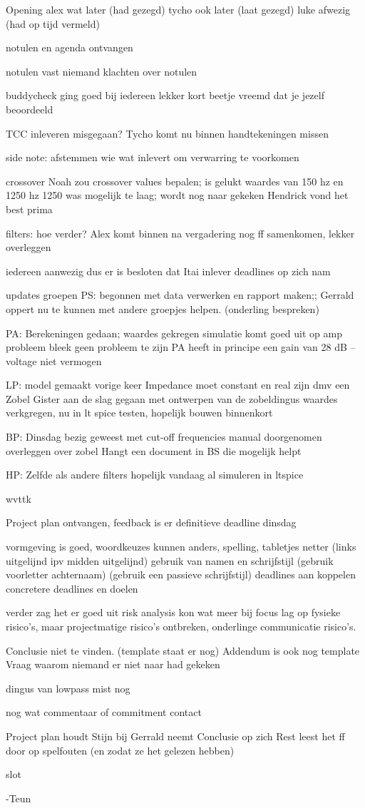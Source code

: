 Opening
alex wat later (had gezegd)
tycho ook later (laat gezegd)
luke afwezig (had op tijd vermeld)

notulen en agenda ontvangen

notulen vast
niemand klachten over notulen

buddycheck
ging goed bij iedereen
lekker kort
beetje vreemd dat je jezelf beoordeeld 

TCC
inleveren misgegaan?
Tycho komt nu binnen
handtekeningen missen 

side note: afstemmen wie wat inlevert om verwarring te voorkomen 

crossover
Noah zou crossover values bepalen; is gelukt 
waardes van 150 hz en 1250 hz
1250 was mogelijk te laag; wordt nog naar gekeken
Hendrick vond het best prima

filters: hoe verder?
Alex komt binnen
na vergadering nog ff samenkomen, lekker overleggen

iedereen aanwezig dus er is besloten dat Itai inlever deadlines op zich nam

updates groepen
PS: begonnen met data verwerken en rapport maken;; Gerrald oppert nu te kunnen met andere groepjes helpen. (onderling bespreken)

PA: Berekeningen gedaan; waardes gekregen
simulatie komt goed uit
op amp probleem bleek geen probleem te zijn
PA heeft in principe een gain van 28 dB  – voltage niet vermogen

LP: model gemaakt vorige keer
Impedance moet constant en real zijn dmv een Zobel
Gister aan de slag gegaan met ontwerpen van de zobeldingus
waardes verkgregen, nu in lt spice testen, hopelijk bouwen binnenkort

BP:
Dinsdag bezig geweest met cut-off frequencies
manual doorgenomen
overleggen over zobel
Hangt een document in BS die mogelijk helpt 

HP:
Zelfde als andere filters
hopelijk vandaag al simuleren in ltspice

wvttk

Project plan
ontvangen, feedback is er
definitieve deadline dinsdag

vormgeving is goed, woordkeuzes kunnen anders, spelling, tabletjes netter (links uitgelijnd ipv midden uitgelijnd)
gebruik van namen en schrijfstijl (gebruik voorletter achternaam) (gebruik een passieve schrijfstijl) 
deadlines aan koppelen
concretere deadlines en doelen  

verder zag het er goed uit
risk analysis kon wat meer bij
focus lag op fysieke risico’s, maar projectmatige risico’s ontbreken, onderlinge communicatie risico’s.

Conclusie niet te vinden. (template staat er nog)
Addendum is ook nog template
Vraag waarom niemand er niet naar had gekeken

dingus van lowpass mist nog 

nog wat commentaar of commitment contact


Project plan houdt Stijn bij 
Gerrald neemt Conclusie op zich
Rest leest het ff door op spelfouten (en zodat ze het gelezen hebben)

slot


-Teun
